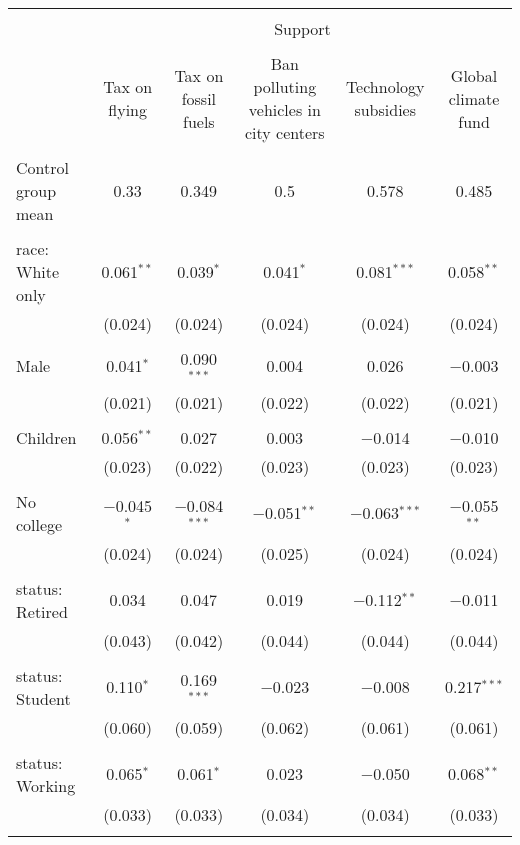 
\begin{tabular}{@{\extracolsep{5pt}}lccccc} 
\\[-1.8ex]\hline 
\hline \\[-1.8ex] 
 & \multicolumn{5}{c}{Support} \\ 
\cline{2-6} 
\\[-1.8ex] & Tax on flying & Tax on fossil fuels & Ban polluting vehicles in city centers & Technology subsidies & Global climate fund \\ 
\hline \\[-1.8ex] 
 Control group mean & 0.33 & 0.349 & 0.5 & 0.578 & 0.485  \\ \hline \\[-1.8ex] race: White only & 0.061$^{**}$ & 0.039$^{*}$ & 0.041$^{*}$ & 0.081$^{***}$ & 0.058$^{**}$ \\ 
  & (0.024) & (0.024) & (0.024) & (0.024) & (0.024) \\ 
  & & & & & \\ 
 Male & 0.041$^{*}$ & 0.090$^{***}$ & 0.004 & 0.026 & $-$0.003 \\ 
  & (0.021) & (0.021) & (0.022) & (0.022) & (0.021) \\ 
  & & & & & \\ 
 Children & 0.056$^{**}$ & 0.027 & 0.003 & $-$0.014 & $-$0.010 \\ 
  & (0.023) & (0.022) & (0.023) & (0.023) & (0.023) \\ 
  & & & & & \\ 
 No college & $-$0.045$^{*}$ & $-$0.084$^{***}$ & $-$0.051$^{**}$ & $-$0.063$^{***}$ & $-$0.055$^{**}$ \\ 
  & (0.024) & (0.024) & (0.025) & (0.024) & (0.024) \\ 
  & & & & & \\ 
 status: Retired & 0.034 & 0.047 & 0.019 & $-$0.112$^{**}$ & $-$0.011 \\ 
  & (0.043) & (0.042) & (0.044) & (0.044) & (0.044) \\ 
  & & & & & \\ 
 status: Student & 0.110$^{*}$ & 0.169$^{***}$ & $-$0.023 & $-$0.008 & 0.217$^{***}$ \\ 
  & (0.060) & (0.059) & (0.062) & (0.061) & (0.061) \\ 
  & & & & & \\ 
 status: Working & 0.065$^{*}$ & 0.061$^{*}$ & 0.023 & $-$0.050 & 0.068$^{**}$ \\ 
  & (0.033) & (0.033) & (0.034) & (0.034) & (0.033) \\ 
  & & & & & \\ 

\end{tabular}
